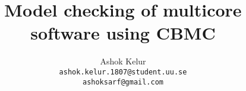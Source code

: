 \documentclass[titlepage]{book}
\begin{document}
\begin{titlepage}
\author{Ashok Kelur\\\texttt{ashok.kelur.1807@student.uu.se}\\\texttt{ashoksarf@gmail.com}}
\title{Model checking of multicore software using CBMC}
\thispagestyle{empty}
\end{titlepage}
\date{}





\newif\ifericsson

\begin{comment}
\newpage
\centering{And as in Arithmetique, unpractised men must, and Professors themselves may often erre, and cast up false; so also in any other subject of Reasoning, the ablest, most attentive, and most practised men, may deceive themselves, and inferre false Conclusions, Not but that Reason it selfe is alwayes Right Reason, as well as Arithmetique is a certain and infallible Art: But no one mans Reason, nor the Reason of any one number of men, makes the certaintie; no more than an account is therefore well cast up, because a great many men have unanimously approved it.}

- Leviathan, Thomas Hobbes
\newpage

\section{Abstract}


Computers have been key subsystems in various complex systems. As computers are adapted into various fields, hardware and software are increasing in size and complexity. It is evident that parallel computing is the way to solve large scale complex information technology problems.

Engineers designing hardware and software are required to verify the system for correctness. As system's size and complexity increases, it is difficult to perform manual system verification. Model checking converts a hardware or software solution into temporal logic and uses solvers to assert on properties of solution. A Bounded Model Checker can verify properties of program/logic within bounded limits. CBMC \index{CBMC}is a Bounded Model Checker for ANSI-C and C++ programs.




\end{comment}
\end{document}
